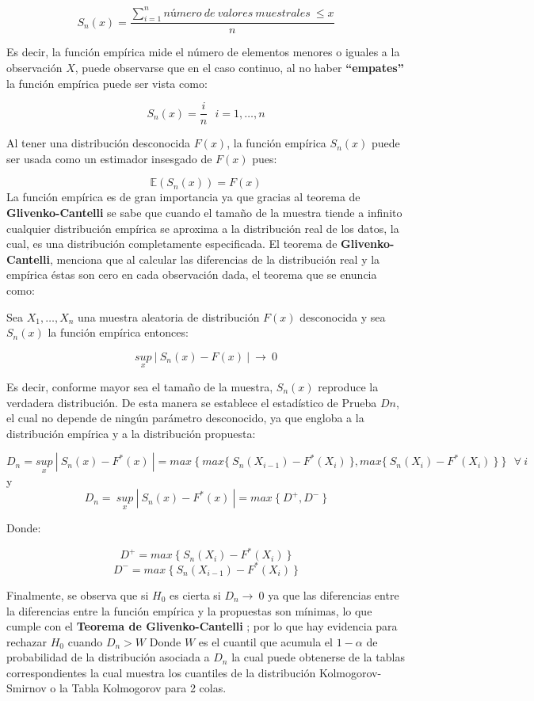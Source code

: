 \documentclass[
  a4paper,
  oneside,
  openany]{book}
\begin{document}
\[S_{n}(x)=\frac{ \sum_{i=1}^{n}número\ de\ valores\ muestrales\ \leq x}{n}\]

Es decir, la función empírica mide el número de elementos menores o iguales a la observación
\(X\), puede observarse que en el caso continuo, al no haber \textbf{``empates''} la función empírica puede
ser vista como:

\[S_{n}(x)=\frac{i}{n} \ \ \ i=1,\ldots,n\]

Al tener una distribución desconocida \(F(x)\), la función empírica \(S_{n}(x)\) puede ser usada
como un estimador insesgado de \(F(x)\) pues:

\[\mathbb{E}(S_{n}(x))=F(x)\]
La función empírica es de gran importancia ya que gracias al teorema de \textbf{Glivenko-Cantelli}
se sabe que cuando el tamaño de la muestra tiende a infinito cualquier distribución empírica
se aproxima a la distribución real de los datos, la cual, es una distribución completamente especificada. El teorema de \textbf{Glivenko-Cantelli}, menciona que al calcular las diferencias de la distribución real y la empírica éstas son cero en cada observación dada, el teorema que se enuncia como:

Sea \(X_{1},\ldots,X_{n}\) una muestra aleatoria de distribución \(F(x)\) desconocida y sea \(S_{n}(x)\) la función empírica entonces:

\[\underset{x}{sup} \ |\ S_{n}(x)-F(x) \ | \ \longrightarrow \ 0\]

Es decir, conforme mayor sea el tamaño de la muestra, \(S_{n}(x)\) reproduce la verdadera
distribución. De esta manera se establece el estadístico de Prueba \(Dn\), el cual no depende de ningún
parámetro desconocido, ya que engloba a la distribución empírica y a la distribución propuesta:

\[D_{n}=\underset{x}{sup} \ | \ S_{n}(x)-F^*(x) \ |=max \  \{ \ max \{ \  S_{n}(X_{i-1})-F^*(X_{i}) \ \},max \{ \  S_{n}(X_{i})-F^*(X_{i}) \ \} \ \} \ \  \ \forall \ i\]
y \[D_{n}= \ \underset{x}{sup} \ | \ S_{n}(x)-F^*(x) \ |=max \ \{ \  D^+,D^- \ \}\]

Donde:

\[D^+= max \ \{ \  S_{n}(X_{i})-F^*(X_{i}) \ \}\]
\[D^-= max \  \{ \ S_{n}(X_{i-1})-F^*(X_{i}) \ \}\]

Finalmente, se observa que si \(H_0\) es cierta si \(D_{n} \longrightarrow \ 0\) ya que las diferencias entre la diferencias entre la función empírica y la propuestas son mínimas, lo que cumple con el \textbf{Teorema de Glivenko-Cantelli} ; por lo que hay evidencia para rechazar \(H_0\) cuando \(D_{n} > W\) Donde \(W\) es el cuantil que acumula el \(1- \alpha\) de probabilidad de la distribución asociada a \(D_{n}\) la cual puede obtenerse de la tablas correspondientes la cual muestra los cuantiles de la distribución
Kolmogorov-Smirnov o la Tabla Kolmogorov para 2 colas.
\end{document}
